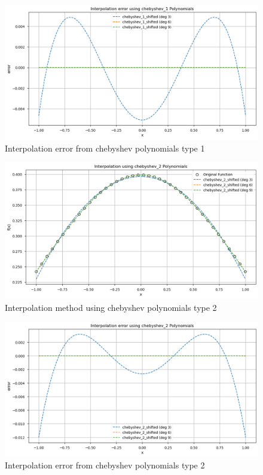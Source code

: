 \documentclass[10pt]{article}
\begin{document}
\begin{figure}[H]
    \centering
    \includegraphics[width=\imagewidth\textwidth]{figures/02_interpolation/interpolation_error_method_chebyshev_1_shifted.png}
    \caption{Interpolation error from chebyshev polynomials type 1}
\end{figure}

\begin{figure}[H]
    \centering
    \includegraphics[width=\imagewidth\textwidth]{figures/02_interpolation/interpolation_method_chebyshev_2_shifted.png}
    \caption{Interpolation method using chebyshev polynomials type 2}
\end{figure}

\begin{figure}[H]
    \centering
    \includegraphics[width=\imagewidth\textwidth]{figures/02_interpolation/interpolation_error_method_chebyshev_2_shifted.png}
    \caption{Interpolation error from chebyshev polynomials type 2}
\end{figure}
\end{document}
